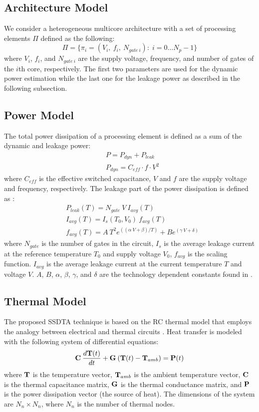 \subsection{Architecture Model}
We consider a heterogeneous multicore architecture with a set of processing elements $\Pi$ defined as the following:
\[
  \Pi = \{ \pi_i = (V_i, \: f_i, \: N_{gate \: i}): \; i = 0 \dots N_p - 1 \}
\]
where $V_i$, $f_i$, and $N_{gate \: i}$ are the supply voltage, frequency, and number of gates \cite{liao2005} of the $i$th core, respectively. The first two parameters are used for the dynamic power estimation while the last one for the leakage power as described in the following subsection.

\subsection{Power Model} \label{sec:power-model}
The total power dissipation of a processing element is defined as a sum of the dynamic and leakage power:
\begin{align*}
  & P = P_{dyn} + P_{leak} \\
  & P_{dyn} = C_{eff} \cdot f \cdot V^2
\end{align*}
where $C_{eff}$ is the effective switched capacitance, $V$ and $f$ are the supply voltage and frequency, respectively. The leakage part of the power dissipation is defined as \cite{liao2005}:
\begin{align*}
  & P_{leak}(T) = N_{gate} \: V \: I_{avg}(T) \\
  & I_{avg}(T) = I_s(T_0, V_0) \: f_{avg}(T) \\
  & f_{avg}(T) = A \: T^2 e^{((\alpha \: V + \beta)/T)} + B e^{(\gamma \: V + \delta)}
\end{align*}
where $N_{gate}$ is the number of gates in the circuit, $I_s$ is the average leakage current at the reference temperature $T_0$ and supply voltage $V_0$, $f_{avg}$ is the scaling function. $I_{avg}$ is the average leakage current at the current temperature $T$ and voltage $V$. $A$, $B$, $\alpha$, $\beta$, $\gamma$, and $\delta$ are the technology dependent constants found in \cite{liao2005}.

\subsection{Thermal Model}
The proposed SSDTA technique is based on the RC thermal model that employs the analogy between electrical and thermal circuits \cite{kreith2000}. Heat transfer is modeled with the following system of differential equations:
\begin{equation} \label{eq:fourier-model}
  \mathbf{C} \: \frac{d\mathbf{T}(t)}{dt} + \mathbf{G} \: (\mathbf{T}(t) - \mathbf{T}_{amb})= \mathbf{P}(t)
\end{equation}
where $\mathbf{T}$ is the temperature vector, $\mathbf{T}_{amb}$ is the ambient temperature vector, $\mathbf{C}$ is the thermal capacitance matrix, $\mathbf{G}$ is the thermal conductance matrix, and $\mathbf{P}$ is the power dissipation vector (the source of heat). The dimensions of the system are $N_n \times N_n$, where $N_n$ is the number of thermal nodes.

